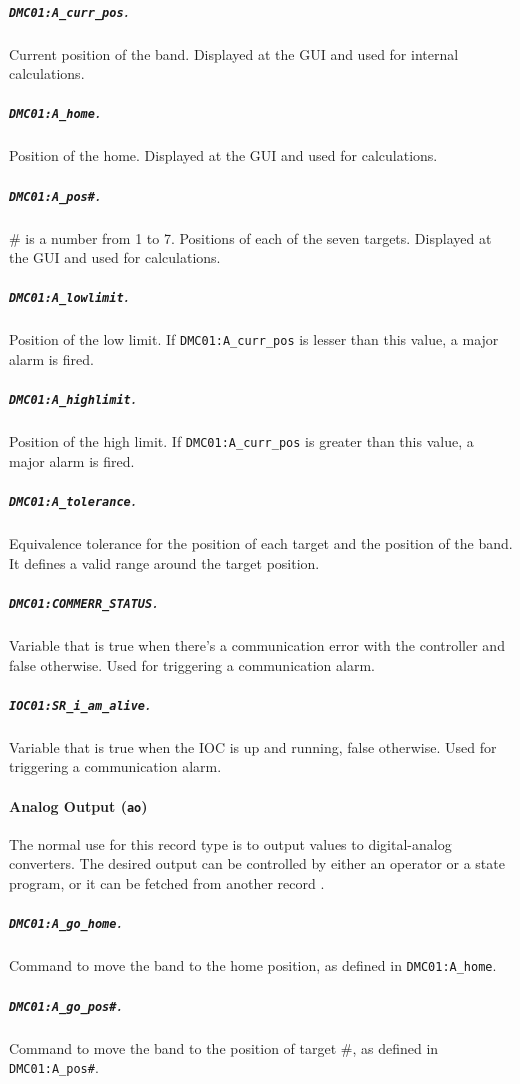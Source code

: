         \subparagraph{\texttt{DMC01:A\_curr\_pos}.}
            Current position of the band.
            Displayed at the GUI and used for internal calculations.

        \subparagraph{\texttt{DMC01:A\_home}.}
            Position of the home.
            Displayed at the GUI and used for calculations.

        \subparagraph{\texttt{DMC01:A\_pos\#}.}
            \# is a number from 1 to 7.
            Positions of each of the seven targets.
            Displayed at the GUI and used for calculations.

        \subparagraph{\texttt{DMC01:A\_lowlimit}.}
            Position of the low limit.
            If \texttt{DMC01:A\_curr\_pos} is lesser than this value, a major alarm is fired.

        \subparagraph{\texttt{DMC01:A\_highlimit}.}
            Position of the high limit.
            If \texttt{DMC01:A\_curr\_pos} is greater than this value, a major alarm is fired.

        \subparagraph{\texttt{DMC01:A\_tolerance}.}
            Equivalence tolerance for the position of each target and the position of the band.
            It defines a valid range around the target position.

        \subparagraph{\texttt{DMC01:COMMERR\_STATUS}.}
            Variable that is true when there's a communication error with the controller and false otherwise.
            Used for triggering a communication alarm.

        \subparagraph{\texttt{IOC01:SR\_i\_am\_alive}.}
            Variable that is true when the IOC is up and running, false otherwise.
            Used for triggering a communication alarm.

    \paragraph{Analog Output (\texttt{ao})}
        The normal use for this record type is to output values to digital-analog converters.
        The desired output can be controlled by either an operator or a state program, or it can be fetched from another record \cite{stanley1998}.
    
        \subparagraph{\texttt{DMC01:A\_go\_home}.}
            Command to move the band to the home position, as defined in \texttt{DMC01:A\_home}.

        \subparagraph{\texttt{DMC01:A\_go\_pos\#}.}
            Command to move the band to the position of target \#, as defined in \texttt{DMC01:A\_pos\#}.

